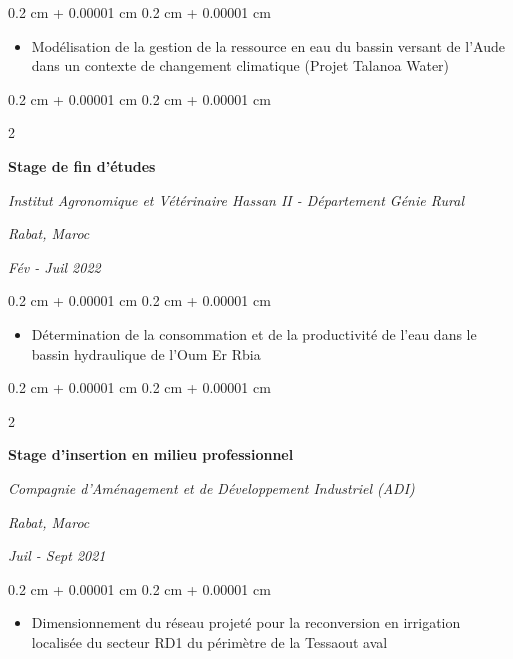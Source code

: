 \documentclass[10pt, letterpaper]{article}
\newenvironment{highlights}{
  \begin{itemize}[
    topsep=0.10 cm,
    parsep=0.10 cm,
    partopsep=0pt,
    itemsep=0pt,
    leftmargin=0.4 cm + 10pt
  ]
}{
  \end{itemize}
} %
\newenvironment{onecolentry}{
  \begin{adjustwidth}{
    0.2 cm + 0.00001 cm
  }{
    0.2 cm + 0.00001 cm
  }
}{
  \end{adjustwidth}
} %
\newenvironment{twocolentry}[2][]{
  \onecolentry
  \def\secondColumn{#2}
  \setcolumnwidth{\fill, 4.9 cm}
  \begin{paracol}{2}
}{
  \switchcolumn \raggedleft \secondColumn
  \end{paracol}
  \endonecolentry
} %
\begin{document}
  \vspace{0.10 cm}

  \begin{onecolentry}
    \begin{highlights}
      \item Modélisation de la gestion de la ressource en eau du bassin versant de
      l'Aude dans un contexte de changement climatique (Projet Talanoa Water)
    \end{highlights}
  \end{onecolentry}

  \vspace{0.1 cm}

  \begin{twocolentry}
    {
      \textit{Rabat, Maroc}

      \textit{Fév - Juil 2022}
    }
    {
      \textbf{Stage de fin d'études}

      \textit{Institut Agronomique et Vétérinaire Hassan II - Département
      Génie Rural}
    }
  \end{twocolentry}

  \vspace{0.10 cm}

  \begin{onecolentry}
    \begin{highlights}
      \item Détermination de la consommation et de la productivité de l'eau
      dans le bassin hydraulique de l'Oum Er Rbia
    \end{highlights}
  \end{onecolentry}

  \vspace{0.1 cm}

  \begin{twocolentry}
    {
      \textit{Rabat, Maroc}

      \textit{Juil - Sept 2021}
    }
    {
      \textbf{Stage d'insertion en milieu professionnel}

      \textit{Compagnie d'Aménagement et de Développement Industriel (ADI)}
    }
  \end{twocolentry}

  \vspace{0.10 cm}

  \begin{onecolentry}
    \begin{highlights}
      \item Dimensionnement du réseau projeté pour la reconversion en irrigation
      localisée du secteur RD1 du périmètre de la Tessaout aval
    \end{highlights}
  \end{onecolentry}
\end{document}
